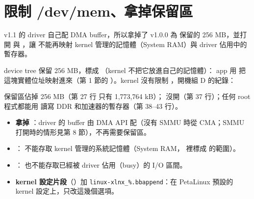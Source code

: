 \section{限制 /dev/mem、拿掉保留區}
\label{sec:devmem}

\begin{oneline}
v1.1 的 driver 自己配 DMA buffer，所以拿掉了 v1.0.0 為  保留的 256 MB，並打開  與 ，讓  不能再映射 kernel 管理的記憶體（System RAM）與 driver 佔用中的暫存器。
\end{oneline}

\begin{before}[原本怎麼做（v1.0.0）]
device tree 保留 256 MB，標成 （kernel 不把它放進自己的記憶體）：
app 用  把這塊實體位址映射進來（第 1 節的 ）。kernel 沒有限制 ，開機組 D 的紀錄：


保留區佔掉 256 MB（第 27 行  只有 1,773,764 kB）； 沒開（第 37 行）；任何 root 程式都能用  讀寫 DDR 和加速器的暫存器（第 38--43 行）。
\end{before}

\begin{tech}
\begin{itemize}
\item \textbf{拿掉 }：driver 的 buffer 由 DMA API 配（沒有 SMMU 時從 CMA；SMMU 打開時的情形見第 8 節），不再需要保留區。
\item {}： 不能存取 kernel 管理的系統記憶體（System RAM， 裡標成  的範圍）。
\item {}： 也不能存取已經被 driver 佔用（busy）的 I/O 區間。
\item \textbf{kernel 設定片段}（）加 \texttt{linux-xlnx\_\%.bbappend}：在 PetaLinux 預設的 kernel 設定上，只改這幾個選項。
\end{itemize}
\end{tech}

